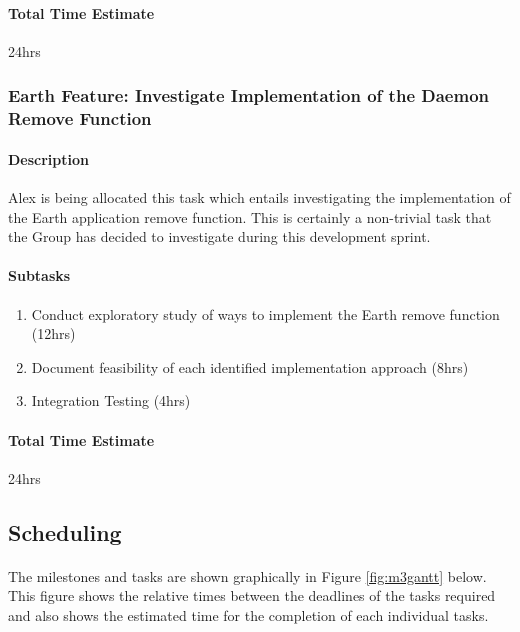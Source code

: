 \documentclass[10pt,a4,oneside]{article}
\begin{document}
\paragraph{Total Time Estimate} 24hrs
 
\subsubsection{Earth Feature: Investigate Implementation of the Daemon Remove Function}

\paragraph{Description}
Alex is being allocated this task which entails investigating the implementation of the 
Earth application remove function. This is certainly a non-trivial task that the Group 
has decided to investigate during this development sprint.

\paragraph{Subtasks}
\noindent
\begin{enumerate}
\item Conduct exploratory study of ways to implement the Earth remove function (12hrs)
\item Document feasibility of each identified implementation approach (8hrs)
\item Integration Testing (4hrs)
\end{enumerate}

\paragraph{Total Time Estimate} 24hrs

\newpage
 
\subsection{Scheduling}

\paragraph{} 
The milestones and tasks are shown graphically in Figure \ref{fig:m3gantt} below. 
This figure shows the relative times between the deadlines of the tasks required 
and also shows the estimated time for the completion of each individual tasks.
 
\end{document}
